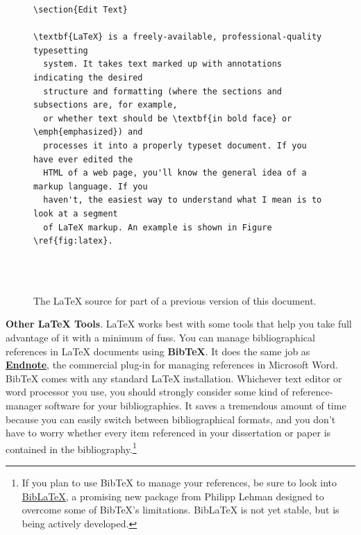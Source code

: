 \documentclass[11pt,article,oneside]{memoir}
\begin{document}
\begin{figure}
\begin{lstlisting}[style=sweave-top]
\end{lstlisting}
\begin{lstlisting}[language={[latex]tex},numbers=none,style=sweave-tex]
\section{Edit Text}

\textbf{LaTeX} is a freely-available, professional-quality typesetting
  system. It takes text marked up with annotations indicating the desired
  structure and formatting (where the sections and subsections are, for example, 
  or whether text should be \textbf{in bold face} or \emph{emphasized}) and 
  processes it into a properly typeset document. If you have ever edited the 
  HTML of a web page, you'll know the general idea of a markup language. If you 
  haven't, the easiest way to understand what I mean is to look at a segment 
  of LaTeX markup. An example is shown in Figure \ref{fig:latex}.

 
\end{lstlisting}
\begin{lstlisting}[style=sweave-bottom]
\end{lstlisting}
\caption{The LaTeX source for part of a previous version of this document.}
\label{fig:latex}
\end{figure}

\smallskip

\textbf{Other LaTeX Tools}. LaTeX works best with some tools that help you take full advantage of it with a minimum of fuss. You can manage bibliographical references in LaTeX documents using \textbf{BibTeX}. It does the same job as \href{http://www.endnote.com/}{\textbf{Endnote}}, the commercial plug-in for managing references in Microsoft Word. BibTeX comes with any standard LaTeX installation. Whichever text editor or word processor you use, you should strongly consider some kind of reference-manager software for your bibliographies. It saves a tremendous amount of time because you can easily switch between bibliographical formats, and you don't have to worry whether every item referenced in your dissertation or paper is contained in the bibliography.\footnote{If you plan to use BibTeX to manage your references, be sure to look into \href{http://www.ctan.org/tex-archive/help/Catalogue/entries/biblatex.html}{BibLaTeX}, a promising new package from Philipp Lehman designed to overcome some of BibTeX's limitations. BibLaTeX is not yet stable, but is being actively developed.}    
\end{document}
